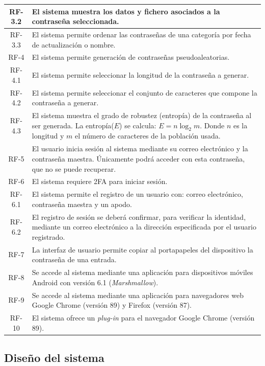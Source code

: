 \documentclass{article}
\begin{document}
\begin{table}[H]
\begin{tabular}{| c | p{30em} |}
        RF-3.2 & El sistema muestra los datos y fichero asociados a la contraseña seleccionada. \\ \hline
        RF-3.3 & El sistema permite ordenar las contraseñas de una categoría por fecha de actualización o nombre. \\ \hline
        RF-4 & El sistema permite generación de contraseñas pseudoaleatorias. \\ \hline
        RF-4.1 & El sistema permite seleccionar la longitud de la contraseña a generar.\\ \hline
        RF-4.2 & El sistema permite seleccionar el conjunto de caracteres que compone la contraseña a generar.\\ \hline
        RF-4.3 & El sistema muestra el grado de robustez (entropía) de la contraseña al ser generada. La entropía($E$) se calcula: $E=n\log_2m$. Donde $n$ es la longitud y $m$ el número de caracteres de la población usada.\\ \hline
        RF-5 & El usuario inicia sesión al sistema mediante su correo electrónico y la contraseña maestra. Únicamente podrá acceder con esta contraseña, que no se puede recuperar.\\ \hline
        RF-6 & El sistema requiere 2FA para iniciar sesión. \\ \hline
        RF-6.1 & El sistema permite el registro de un usuario con: correo electrónico, contraseña maestra y un apodo.\\ \hline 
        RF-6.2 & El registro de sesión se deberá confirmar, para verificar la identidad, mediante un correo electrónico a la dirección especificada por el usuario registrado. \\ \hline
        RF-7 & La interfaz de usuario permite copiar al portapapeles del dispositivo la contraseña de una entrada. \\ \hline 
        RF-8 & Se accede al sistema mediante una aplicación para dispositivos móviles Android con versión 6.1 (\textit{Marshmallow}). \\ \hline
        RF-9 & Se accede al sistema mediante una aplicación para navegadores web Google Chrome (versión 89) y Firefox (versión 87). \\ \hline
        RF-10 & El sistema ofrece un \textit{plug-in} para el navegador Google Chrome (versión 89). \\ \hline
    \end{tabular}
\end{table}

\subsection{Diseño del sistema}
\end{document}
